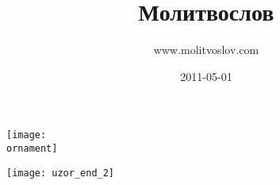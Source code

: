 \documentclass[11pt,oneside]{book}
\title{\Huge\bfseries Молитвослов}
\author{www.molitvoslov.com}
\date{2011-05-01}
\newcommand{\ornament}{uzor_begin_2}
\newlength\headoff
\newcommand\noparindent{\setlength\parindent{0pt}}
\begin{document}
\maketitle

{\noparindent
\vspace*{-\headoff}
\texttt{[image: \\ornament]}}

\tableofcontents
\nopagebreak\bigskip\bigskip
\begin{center}
\texttt{[image: uzor\_end\_2]}
\end{center}


\end{document}
